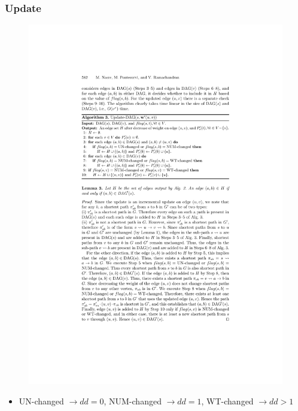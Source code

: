 \begin{frame}
  \frametitle{\spdag Update}

  \begin{figure}[H]
    \centering
    \includegraphics[width=\textwidth]{imgs/npr14-algo3}
  \end{figure}

  \begin{itemize}
    \item UN-changed $\rightarrow dd=0$, NUM-changed $\rightarrow dd=1$, WT-changed $\rightarrow dd>1$
  \end{itemize}
\end{frame}


